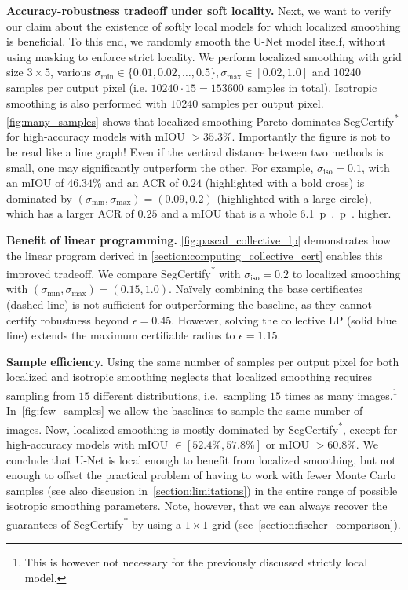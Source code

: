 \documentclass{article} %
\theoremstyle{plain}
\theoremstyle{definition}
\theoremstyle{remark}
\begin{document}
\textbf{Accuracy-robustness tradeoff under soft locality.}
Next, we want to verify our claim about the existence of softly local models for which localized smoothing is beneficial.
To this end, we randomly smooth the U-Net model itself, without using masking to enforce strict locality.
We perform localized smoothing with grid size $3 \times 5$, various $\sigma_\mathrm{min} \in \{0.01,0.02,\dots,0.5\}, \sigma_\mathrm{max} \in [0.02,1.0]$ and $10240$ samples per output pixel (i.e. $10240 \cdot 15 = 153600$ samples in total). Isotropic smoothing is also performed with $10240$ samples per output pixel.
\autoref{fig:many_samples} shows that localized smoothing Pareto-dominates SegCertify\textsuperscript{*} for high-accuracy models with mIOU $> 35.3\%$.
Importantly the figure is not to be read like a line graph! Even if the vertical distance between two methods is small, one may significantly outperform the other.
For example, $\sigma_\mathrm{iso}=0.1$, with an mIOU of $46.34\%$ and an ACR of $0.24$ (highlighted with a bold cross)
is dominated by $\left(\sigma_\mathrm{min},\sigma_\mathrm{max}\right) = (0.09, 0.2)$ (highlighted with a large circle), which has a larger ACR of $0.25$ and a mIOU that is a whole \SI{6.1}{p{.}p{.}} higher.

\textbf{Benefit of linear programming.}
\autoref{fig:pascal_collective_lp} demonstrates how the linear program derived in \autoref{section:computing_collective_cert} enables this improved  tradeoff.
We compare SegCertify\textsuperscript{*} with $\sigma_\mathrm{iso} = 0.2$ to localized smoothing with $\left(\sigma_\mathrm{min},\sigma_\mathrm{max}\right) = (0.15, 1.0)$.
Na\"ively combining the base certificates (dashed line) is not sufficient for outperforming the baseline, as they cannot certify robustness beyond $\epsilon=0.45$. However, 
solving the collective LP (solid blue line) extends the maximum certifiable radius to $\epsilon=1.15$.

\textbf{Sample efficiency.}
Using the same number of samples per output pixel for both localized and isotropic smoothing neglects that localized smoothing requires sampling from $15$ different distributions, i.e.\ sampling $15$ times as many images.\footnote{This is however not necessary for the previously discussed strictly local model.}
In~\autoref{fig:few_samples} we allow the baselines to sample the same number of images.
Now, localized smoothing is mostly dominated by SegCertify\textsuperscript{*}, except for high-accuracy models with mIOU $\in [52.4\%,57.8\%]$ or mIOU $>60.8\%$.
We conclude that U-Net is local enough to benefit from localized smoothing, but not enough to offset the practical problem of having to work with fewer Monte Carlo samples (see also discusion in~\autoref{section:limitations})
in the entire range of possible isotropic smoothing parameters.
Note, however, that we can always recover the guarantees of SegCertify\textsuperscript{*} by using a $1 \times 1$ grid (see~\autoref{section:fischer_comparison}).
\end{document}
